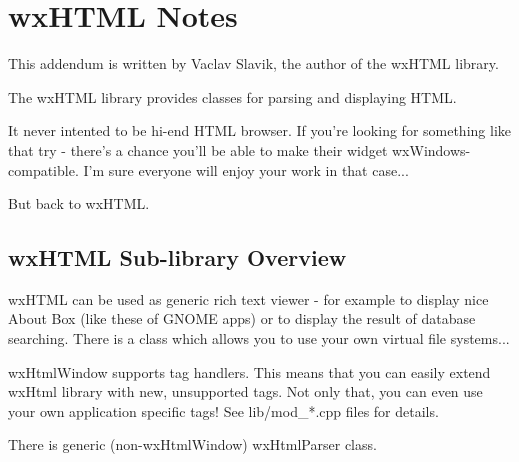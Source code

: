 \chapter{wxHTML Notes}\label{wxHTML}
%
%
\setfooter{\thepage}{}{}{}{}{\thepage}%

This addendum is written by Vaclav Slavik, the author of the wxHTML library.

The wxHTML library provides classes for parsing and displaying HTML.

It never intented to be hi-end HTML browser. If you're looking for
something like that try  - there's a 
chance you'll be able to make their widget wxWindows-compatible. I'm sure
everyone will enjoy your work in that case...

But back to wxHTML. 

\section{wxHTML Sub-library Overview}\label{wxhtmloverview}

wxHTML can be used as generic rich text viewer - for example to display 
nice About Box (like these of GNOME apps) or to display the result of
database searching. There is a  
class which allows you to use your own virtual file systems...

wxHtmlWindow supports tag handlers. This means that you can easily
extend wxHtml library  with new, unsupported tags. Not only that,
you can even use your own application specific tags!
See lib/mod_*.cpp files for details.

There is generic (non-wxHtmlWindow) wxHtmlParser class.



 





